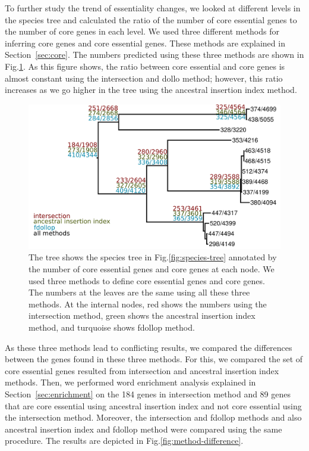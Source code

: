\documentclass[12pt,letterpaper]{article}
\begin{document}
To further study the trend of essentiality changes, we looked at different levels in the species tree and calculated the ratio of the number of core essential genes to the number of core genes in each level. We used three different methods for inferring core genes and core essential genes. These methods are explained in Section~\ref{sec:core}. The numbers predicted using these three methods are shown in Fig.\@ \ref{fig:annotated-speciestree}. As this figure shows, the ratio between core essential and core genes is almost constant using the intersection and dollo method; however, this ratio increases as we go higher in the tree using the ancestral insertion index method.

\begin{figure}
\centering
\includegraphics[scale=0.2]{phylosift-aa-raxmlbootstrap-annotated.pdf}
\caption{The tree shows the species tree in Fig.\@\ref{fig:species-tree} annotated by the number of core essential genes and core genes at each node. We used three methods to define core essential genes and core genes. The numbers at the leaves are the same using all these three methods. At the internal nodes, red shows the numbers using the intersection method, green shows the ancestral insertion index method, and turquoise shows fdollop method.}
\label{fig:annotated-speciestree}
\end{figure}

As these three methods lead to conflicting results, we compared the differences between the genes found in these three methods. For this, we compared the set of core essential genes resulted from intersection and ancestral insertion index methods. Then, we performed word enrichment analysis explained in Section~\ref{sec:enrichment} on the 184 genes in intersection method and 89 genes that are core essential using ancestral insertion index and not core essential using the intersection method. Moreover, the intersection and fdollop methods and also ancestral insertion index and fdollop method were compared using the same procedure. The results are depicted in Fig.\@\ref{fig:method-difference}.
\end{document}

